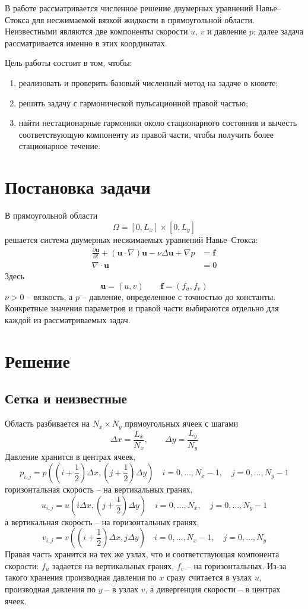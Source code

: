 \documentclass[12pt,a4paper]{article}
\newcommand{\dx}{\Delta x}
\newcommand{\dy}{\Delta y}
\begin{document}
В работе рассматривается численное решение двумерных уравнений Навье--Стокса
для несжимаемой вязкой жидкости в прямоугольной области. Неизвестными являются
две компоненты скорости \(u\), \(v\) и давление \(p\); далее задача
рассматривается именно в этих координатах.

Цель работы состоит в том, чтобы:
\begin{enumerate}
    \item реализовать и проверить базовый численный метод на задаче о кювете;
    \item решить задачу с гармонической пульсационной правой частью;
    \item найти нестационарные гармоники около стационарного состояния и
    вычесть соответствующую компоненту из правой части, чтобы получить более
    стационарное течение.
\end{enumerate}

\section{Постановка задачи}

В прямоугольной области
\[
    \Omega = [0,L_x]\times[0,L_y]
\]
решается система двумерных несжимаемых уравнений Навье--Стокса:
\begin{align}
    \frac{\partial \mathbf{u}}{\partial t}
    + (\mathbf{u}\cdot\nabla)\mathbf{u}
    - \nu \Delta \mathbf{u}
    + \nabla p &= \mathbf{f} \label{eq:ns_momentum}\\
    \nabla\cdot \mathbf{u} &= 0 \label{eq:ns_div}
\end{align}
Здесь
\[
    \mathbf{u}=(u,v) \qquad
    \mathbf{f}=(f_u,f_v)
\]
\(\nu>0\) -- вязкость, а \(p\) -- давление, определенное с
точностью до константы. Конкретные значения параметров и правой части
выбираются отдельно для каждой из рассматриваемых задач.

\section{Решение}

\subsection{Сетка и неизвестные}

Область разбивается на \(N_x\times N_y\) прямоугольных ячеек с шагами
\[
    \dx=\frac{L_x}{N_x}, \qquad \dy=\frac{L_y}{N_y}
\]
Давление хранится в центрах ячеек,
\[
    p_{i,j}=p\left(\left(i+\frac12\right)\dx,
    \left(j+\frac12\right)\dy\right)
    \quad i=0,\dots,N_x-1,\quad j=0,\dots,N_y-1
\]
горизонтальная скорость -- на вертикальных гранях,
\[
    u_{i,j}=u\left(i\dx,\left(j+\frac12\right)\dy\right)
    \quad i=0,\dots,N_x,\quad j=0,\dots,N_y-1
\]
а вертикальная скорость -- на горизонтальных гранях,
\[
    v_{i,j}=v\left(\left(i+\frac12\right)\dx,j\dy\right)
    \quad i=0,\dots,N_x-1,\quad j=0,\dots,N_y
\]
Правая часть хранится на тех же узлах, что и соответствующая компонента
скорости: \(f_u\) задается на вертикальных гранях, \(f_v\) -- на
горизонтальных. Из-за такого хранения производная давления по \(x\) сразу
считается в узлах \(u\), производная давления по \(y\) -- в узлах \(v\), а
дивергенция скорости -- в центрах ячеек.
\end{document}

